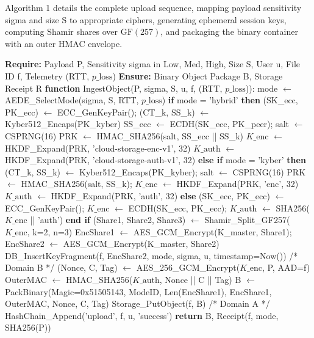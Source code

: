 \documentclass[5p,times]{elsarticle}
\begin{document}
Algorithm 1 details the complete upload sequence, mapping payload sensitivity sigma and size S to appropriate ciphers, generating ephemeral session keys, computing Shamir shares over $\text{GF}(257)$, and packaging the binary container with an outer HMAC envelope.

\begin{algorithm}[!ht]
\caption{Adaptive Quantum-Resistant File Ingestion and Key Distribution Protocol}
\begin{algorithmic}[1]
  \STATE \textbf{Require:} Payload P, Sensitivity sigma in {Low, Med, High}, Size S, User u, File ID f, Telemetry (RTT, $p\_{\text{loss}}$)
  \STATE \textbf{Ensure:} Binary Object Package B, Storage Receipt R
  \STATE \textbf{function} IngestObject(P, sigma, S, u, f, (RTT, $p\_{\text{loss}}$)):
  \STATE mode $\leftarrow$ AEDE\_SelectMode(sigma, S, RTT, $p\_{\text{loss}}$)
  \STATE \textbf{if} mode = 'hybrid' \textbf{then}
  \STATE (SK\_ecc, PK\_ecc) $\leftarrow$ ECC\_GenKeyPair(); (CT\_k, SS\_k) $\leftarrow$ Kyber512\_Encaps(PK\_kyber)
  \STATE SS\_ecc $\leftarrow$ ECDH(SK\_ecc, PK\_peer); salt $\leftarrow$ CSPRNG(16)
  \STATE PRK $\leftarrow$ HMAC\_SHA256(salt, SS\_ecc || SS\_k)
  \STATE $K\_{\text{enc}}$ $\leftarrow$ HKDF\_Expand(PRK, 'cloud-storage-enc-v1', 32)
  \STATE $K\_{\text{auth}}$ $\leftarrow$ HKDF\_Expand(PRK, 'cloud-storage-auth-v1', 32)
  \STATE \textbf{else if} mode = 'kyber' \textbf{then}
  \STATE (CT\_k, SS\_k) $\leftarrow$ Kyber512\_Encaps(PK\_kyber); salt $\leftarrow$ CSPRNG(16)
  \STATE PRK $\leftarrow$ HMAC\_SHA256(salt, SS\_k); $K\_{\text{enc}}$ $\leftarrow$ HKDF\_Expand(PRK, 'enc', 32)
  \STATE $K\_{\text{auth}}$ $\leftarrow$ HKDF\_Expand(PRK, 'auth', 32)
  \STATE \textbf{else} (SK\_ecc, PK\_ecc) $\leftarrow$ ECC\_GenKeyPair(); $K\_{\text{enc}}$ $\leftarrow$ ECDH(SK\_ecc, PK\_ecc); $K\_{\text{auth}}$ $\leftarrow$ SHA256($K\_{\text{enc}}$ || 'auth') \textbf{end if}
  \STATE (Share1, Share2, Share3) $\leftarrow$ Shamir\_Split\_GF257($K\_{\text{enc}}$, k=2, n=3)
  \STATE EncShare1 $\leftarrow$ AES\_GCM\_Encrypt(K\_master, Share1); EncShare2 $\leftarrow$ AES\_GCM\_Encrypt(K\_master, Share2)
  \STATE DB\_InsertKeyFragment(f, EncShare2, mode, sigma, u, timestamp=Now()) /* Domain B */
  \STATE (Nonce, C, Tag) $\leftarrow$ AES\_256\_GCM\_Encrypt($K\_{\text{enc}}$, P, AAD=f)
  \STATE OuterMAC $\leftarrow$ HMAC\_SHA256($K\_{\text{auth}}$, Nonce || C || Tag)
  \STATE B $\leftarrow$ PackBinary(Magic=0x51505143, ModeID, Len(EncShare1), EncShare1, OuterMAC, Nonce, C, Tag)
  \STATE Storage\_PutObject(f, B) /* Domain A */
  \STATE HashChain\_Append('upload', f, u, 'success')
  \STATE \textbf{return} B, Receipt(f, mode, SHA256(P))
\end{algorithmic}
\end{algorithm}
\end{document}
